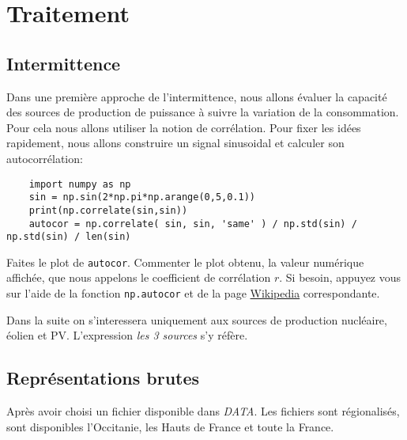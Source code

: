 \documentclass[12pt,french]{article}
\newcommand{\tmtextit}[1]{{\itshape{#1}}}
\begin{document}
\section{Traitement}


\subsection{Intermittence}

Dans une première approche de l'intermittence, nous allons évaluer la capacité des sources de production de puissance à suivre la variation de la consommation.  Pour cela nous allons utiliser la notion de corrélation. Pour fixer les idées rapidement, nous allons construire un signal sinusoidal et calculer son autocorrélation: 
\begin{lstlisting}
	import numpy as np
	sin = np.sin(2*np.pi*np.arange(0,5,0.1))
	print(np.correlate(sin,sin))
	autocor = np.correlate( sin, sin, 'same' ) / np.std(sin) / np.std(sin) / len(sin)
\end{lstlisting}
Faites le plot de \texttt{autocor}. Commenter le plot obtenu, la valeur numérique affichée, que nous appelons le coefficient de corrélation $r$. Si besoin, appuyez vous sur l'aide de la fonction \texttt{np.autocor} et de la page \href{https://fr.wikipedia.org/wiki/Corr\%C3\%A9lation_(statistiques)}{Wikipedia} correspondante.

Dans la suite on s'interessera uniquement aux sources de production nucléaire, éolien et PV. L'expression \tmtextit{les 3 sources} s'y réfère.


\subsection{Représentations brutes}
Après avoir choisi un fichier disponible dans \textit{DATA}. Les fichiers sont régionalisés, sont disponibles l'Occitanie, les Hauts de France et toute la France.
\end{document}
